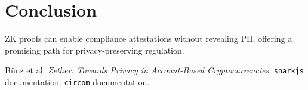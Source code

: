 \documentclass[11pt]{article}
\begin{document}
\section{Conclusion}
ZK proofs can enable compliance attestations without revealing PII, offering a promising path for privacy-preserving regulation.


\begin{thebibliography}{9}
 Bünz et al. \textit{Zether: Towards Privacy in Account-Based Cryptocurrencies}.
 \texttt{snarkjs} documentation.
 \texttt{circom} documentation.
\end{thebibliography}
\end{document}
